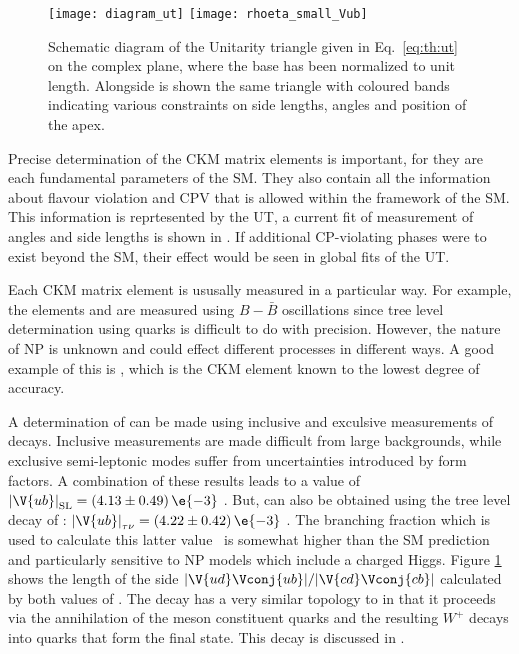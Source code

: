 \begin{figure}
  \begin{center}
      \texttt{[image: diagram\_ut]}
      \texttt{[image: rhoeta\_small\_Vub]}
  \end{center}
  \caption[Unitarity triangle]{\small
    Schematic diagram of the Unitarity triangle given in Eq.~\ref{eq:th:ut} on the complex plane,
    where the base has been normalized to unit length.
    Alongside is shown the same triangle with coloured bands indicating various constraints on
    side lengths, angles and position of the apex.
  }
  \label{fig:th:ut}
\end{figure}

Precise determination of the CKM matrix elements is important, for  they are each fundamental
parameters of the SM.
They also contain all the information about flavour violation and CPV that is allowed within the
framework of the SM.
This information is reprtesented by the UT, a current fit of measurement of angles and side lengths
is shown in .
If additional CP-violating phases were to exist beyond the SM, their effect would be seen in global
fits of the UT.

Each CKM matrix element is ususally measured in a particular way.
For example, the elements  and  are measured using $B-\bar B$ oscillations since tree
level determination using \tquark quarks is difficult to do with precision.
However, the nature of NP is unknown and could effect different processes in different ways.
A good example of this is , which is the CKM element known to the lowest degree of accuracy.

A determination of 
can be made using inclusive and exculsive measurements of
 decays.
Inclusive measurements are made difficult from large
 backgrounds, while exclusive semi-leptonic modes suffer from
uncertainties introduced by form factors.
A combination of these results leads to a value of
$\left|\V{ub}\right|_\mathrm{SL}=\left(4.13\pm0.49\right)\e{-3}$ \cite{PDG2012}.
But,  can also be obtained using the tree level decay of
\decay{\Bp}{\taup\nu_\tau}:
$\left|\V{ub}\right|_{\tau\nu}=\left(4.22\pm0.42\right)\e{-3}$ \cite{PDG2012}.
The branching fraction which is used to calculate this latter value~\cite{Amhis:2012bh} is somewhat
higher than the SM prediction and particularly sensitive to NP models which include a charged
Higgs.
Figure \ref{fig:th:ut} shows the length of the side $|\V{ud}\Vconj{ub}|/|\V{cd}\Vconj{cb}|$
calculated by both values of .
The decay \btodsphi has a very similar topology to \decay{\Bp}{\taup\nu_\tau} in that it proceeds
via the annihilation of the \Bp meson constituent quarks and the resulting $W^+$ decays into quarks
that form the final state.
This decay is discussed in .

